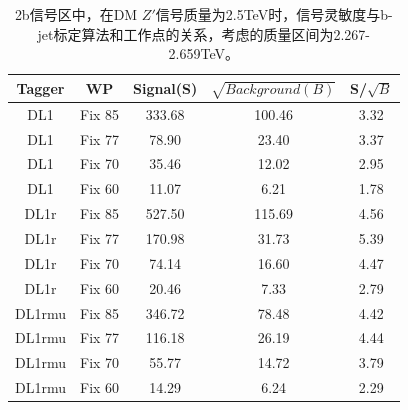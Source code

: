 \begin{table}[ht]
	\begin{center}
		\begin{tabular}{|c|c|c|c|c|}\hline
			Tagger       & WP          & Signal(S)    & $\sqrt{Background(B)}$    & S/$\sqrt{B}$ \\
			\hline
			DL1          & Fix 85      & 333.68     & 100.46        & 3.32        \\
			DL1          & Fix 77      & 78.90      & 23.40         & 3.37        \\
			DL1          & Fix 70      & 35.46      & 12.02         & 2.95        \\
			DL1          & Fix 60      & 11.07      & 6.21          & 1.78        \\
			\hline
			DL1r          & Fix 85      & 527.50      & 115.69       & 4.56        \\
			DL1r          & Fix 77      & 170.98      & 31.73        & 5.39        \\
			DL1r          & Fix 70      & 74.14       & 16.60        & 4.47        \\
			DL1r          & Fix 60      & 20.46       & 7.33         & 2.79        \\
			\hline
			DL1rmu          & Fix 85      & 346.72     & 78.48       & 4.42        \\
			DL1rmu          & Fix 77      & 116.18     & 26.19       & 4.44        \\
			DL1rmu          & Fix 70      & 55.77      & 14.72       & 3.79        \\
			DL1rmu          & Fix 60      & 14.29      & 6.24        & 2.29        \\
			\hline
		\end{tabular}
	\end{center}
	\caption{
	2b信号区中，在DM $Z\prime$信号质量为2.5TeV时，信号灵敏度与b-jet标定算法和工作点的关系，考虑的质量区间为2.267-2.659TeV。
	}
	\label{tab:SenZ2p5TeV}
\end{table}

